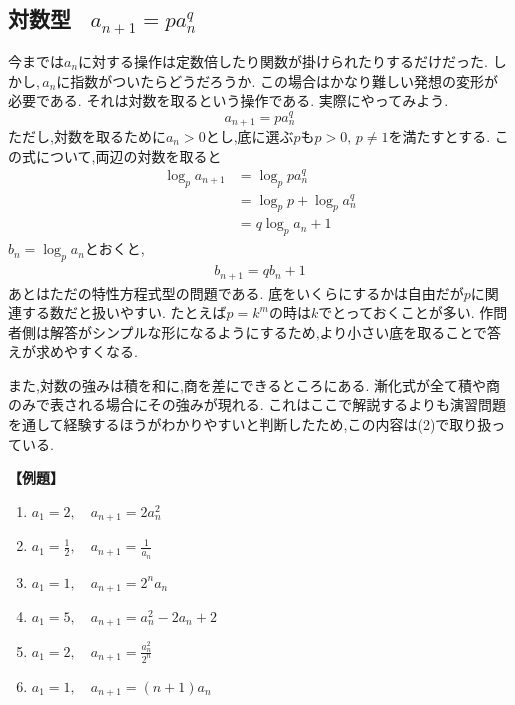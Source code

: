 
\subsection{対数型 \, $a_{n+1}=pa_n^q$}
  今までは$a_n$に対する操作は定数倍したり関数が掛けられたりするだけだった.
  しかし,\,$a_n$に指数がついたらどうだろうか.
  この場合はかなり難しい発想の変形が必要である.
  それは対数を取るという操作である.
  実際にやってみよう.
  \[
    a_{n+1}=pa_n^q
  \]
  ただし,対数を取るために$a_n>0$とし,底に選ぶ$p$も$p>0,\,p\ne1$を満たすとする.
  この式について,両辺の対数を取ると
  \begin{align*}
    \log_p{a_{n+1}}&=\log_p{pa_n^q}\\
    &=\log_p{p}+\log_p{a_n^q}\\
    &=q\log_p{a_n}+1
  \end{align*}
  $b_n=\log_p{a_n}$とおくと,
  \begin{align*}
    b_{n+1}=qb_n+1
  \end{align*}
  あとはただの特性方程式型の問題である.
  底をいくらにするかは自由だが$p$に関連する数だと扱いやすい.
  たとえば$p=k^m$の時は$k$でとっておくことが多い.
  作問者側は解答がシンプルな形になるようにするため,より小さい底を取ることで答えが求めやすくなる.

  また,対数の強みは積を和に,商を差にできるところにある.
  漸化式が全て積や商のみで表される場合にその強みが現れる.
  これはここで解説するよりも演習問題を通して経験するほうがわかりやすいと判断したため,この内容は(2)で取り扱っている.

  \noindent\textbf{【例題】}
  \begin{enumerate}[label=(\arabic*),parsep=3pt]
    \item $\displaystyle a_1=2,\quad a_{n+1}=2a_n^2$
    \item $\displaystyle a_1=\frac{1}{2},\quad a_{n+1}=\frac{1}{a_n}$
    \item $\displaystyle a_1=1,\quad a_{n+1}=2^na_n$
    \item $\displaystyle a_1=5,\quad a_{n+1}=a_n^2-2a_n+2$
    \item $\displaystyle a_1=2,\quad a_{n+1}=\frac{a_n^2}{2^n}$
    \item $\displaystyle a_1=1,\quad a_{n+1}=(n+1)a_n$
  \end{enumerate}


